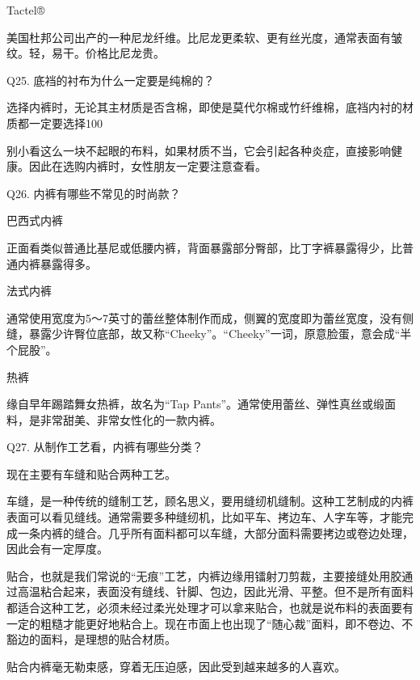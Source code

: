 \documentclass[12pt,UTF8]{ctexbook}
\begin{document}
Tactel®

美国杜邦公司出产的一种尼龙纤维。比尼龙更柔软、更有丝光度，通常表面有皱纹。轻，易干。价格比尼龙贵。





Q25. 底裆的衬布为什么一定要是纯棉的？


选择内裤时，无论其主材质是否含棉，即使是莫代尔棉或竹纤维棉，底裆内衬的材质都一定要选择100%

别小看这么一块不起眼的布料，如果材质不当，它会引起各种炎症，直接影响健康。因此在选购内裤时，女性朋友一定要注意查看。





Q26. 内裤有哪些不常见的时尚款？


巴西式内裤

正面看类似普通比基尼或低腰内裤，背面暴露部分臀部，比丁字裤暴露得少，比普通内裤暴露得多。

法式内裤

通常使用宽度为5～7英寸的蕾丝整体制作而成，侧翼的宽度即为蕾丝宽度，没有侧缝，暴露少许臀位底部，故又称“Cheeky”。“Cheeky”一词，原意脸蛋，意会成“半个屁股”。

热裤

缘自早年踢踏舞女热裤，故名为“Tap Pants”。通常使用蕾丝、弹性真丝或缎面料，是非常甜美、非常女性化的一款内裤。





Q27. 从制作工艺看，内裤有哪些分类？


现在主要有车缝和贴合两种工艺。

车缝，是一种传统的缝制工艺，顾名思义，要用缝纫机缝制。这种工艺制成的内裤表面可以看见缝线。通常需要多种缝纫机，比如平车、拷边车、人字车等，才能完成一条内裤的缝合。几乎所有面料都可以车缝，大部分面料需要拷边或卷边处理，因此会有一定厚度。

贴合，也就是我们常说的“无痕”工艺，内裤边缘用镭射刀剪裁，主要接缝处用胶通过高温粘合起来，表面没有缝线、针脚、包边，因此光滑、平整。但不是所有面料都适合这种工艺，必须未经过柔光处理才可以拿来贴合，也就是说布料的表面要有一定的粗糙才能更好地粘合上。现在市面上也出现了“随心裁”面料，即不卷边、不豁边的面料，是理想的贴合材质。

贴合内裤毫无勒束感，穿着无压迫感，因此受到越来越多的人喜欢。
\end{document}
